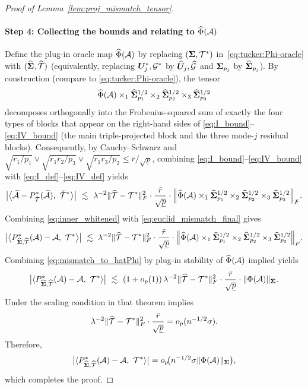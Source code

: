\documentclass[authoryear,preprint,review,12pt]{elsarticle}
\begin{document}
{\begin{proof}[Proof of Lemma~\ref{lem:proj_mismatch_tensor}]
		\paragraph{Step 4: Collecting the bounds and relating to $\widehat{\Phi}(\mathcal{A})$}
		Define the plug-in oracle map $\widehat{\Phi}(\mathcal{A})$ by replacing $(\mathbf{ \Sigma},\mathcal{T}^\ast)$ in~\eqref{eq:tucker:Phi-oracle}
		with $(\widehat{\mathbf{ \Sigma}},\widehat{\mathcal{T}})$ (equivalently, replacing $\boldsymbol U_j^\ast,\mathcal G^\ast$ by $\widehat{\boldsymbol U}_j,\widehat{\mathcal G}$
		and $\mathbf{ \Sigma}_{p_j}$ by $\widehat{\mathbf{ \Sigma}}_{p_j}$).
		By construction (compare to \eqref{eq:tucker:Phi-oracle}), the tensor
		\[
		\widehat{\Phi}(\mathcal{A})\times_1\widehat{\mathbf{ \Sigma}}_{p_1}^{1/2}\times_2\widehat{\mathbf{ \Sigma}}_{p_2}^{1/2}\times_3\widehat{\mathbf{ \Sigma}}_{p_3}^{1/2}
		\]
		decomposes orthogonally into the Frobenius-squared sum of exactly the four types of blocks that appear on the right-hand sides of
		\eqref{eq:I_bound}--\eqref{eq:IV_bound} (the main triple-projected block and the three mode-$j$ residual blocks).
		Consequently, by Cauchy--Schwarz and $\sqrt{r_1/p_1}\vee \sqrt{r_1r_2/p_3}\vee\sqrt{r_1r_3/p_2}\le \bar r/\sqrt{\underline p}$,
		combining \eqref{eq:I_bound}--\eqref{eq:IV_bound} with \eqref{eq:I_def}--\eqref{eq:IV_def} yields
		\begin{equation}\label{eq:euclid_mismatch_final}
			\big|\big\langle \widetilde{\mA}-P_{\check{\mT}}^\ast(\widetilde{\mA}),\ \check{\mT}^\ast\big\rangle\big|
			\ \lesssim\
			\lambda^{-2}\|\widehat{\mT}-\mT^\ast\|_F^2\cdot \frac{\bar r}{\sqrt{\underline p}}\cdot
			\Big\|\widehat{\Phi}(\mA)\times_1\widehat{\bSigma}_{p_1}^{1/2}\times_2\widehat{\bSigma}_{p_2}^{1/2}\times_3\widehat{\bSigma}_{p_3}^{1/2}\Big\|_F.
		\end{equation}
		Combining \eqref{eq:inner_whitened} with \eqref{eq:euclid_mismatch_final} gives
		\begin{equation}\label{eq:mismatch_to_hatPhi}
			\big|\big\langle P_{\widehat{\bSigma},\widehat{\mT}}^\ast(\mA)-\mA,\ \mT^\ast\big\rangle\big|
			\ \lesssim\
			\lambda^{-2}\|\widehat{\mT}-\mT^\ast\|_F^2\cdot \frac{\bar r}{\sqrt{\underline p}}\cdot
			\Big\|\widehat{\Phi}(\mA)\times_1\widehat{\bSigma}_{p_1}^{1/2}\times_2\widehat{\bSigma}_{p_2}^{1/2}\times_3\widehat{\bSigma}_{p_3}^{1/2}\Big\|_F.
		\end{equation}
		Combining \eqref{eq:mismatch_to_hatPhi} by plug-in stability of $\widehat\Phi(\mathcal{A})$ implied yields
		\[
		\big|\langle P_{\widehat{\mathbf{ \Sigma}},\widehat{\mathcal{T}}}^\ast(\mathcal{A})-\mathcal{A},\ \mathcal{T}^\ast\rangle\big|
		\ \lesssim\
		(1+o_p(1))\,
		\lambda^{-2}\|\widehat{\mathcal{T}}-\mathcal{T}^\ast\|_F^2\cdot \frac{\bar r}{\sqrt{\underline p}}\cdot
		\|\Phi(\mathcal{A})\|_{\mathbf{ \Sigma}}.
		\]
		Under  the scaling condition in that theorem implies
		\[
		\lambda^{-2}\|\widehat{\mathcal{T}}-\mathcal{T}^\ast\|_F^2\cdot \frac{\bar r}{\sqrt{\underline p}}
		=
		o_p(n^{-1/2}\sigma).
		\]
		Therefore,
		\[
		\big|\langle P_{\widehat{\mathbf{ \Sigma}},\widehat{\mathcal{T}}}^\ast(\mathcal{A})-\mathcal{A},\ \mathcal{T}^\ast\rangle\big|
		=
		o_p\!\big(n^{-1/2}\sigma\|\Phi(\mathcal{A})\|_{\mathbf{ \Sigma}}\big),
		\]
		which completes the proof.
	\end{proof}
}
\end{document}
